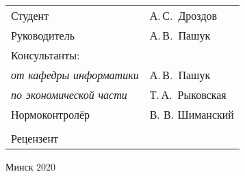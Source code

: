 \begin{titlepage}
\begin{center}
    \begin{tabular}{ p{}p{} }
      Студент & А.\,С.~Дроздов \\
      Руководитель & А.\,В.~Пашук \\
      Консультанты: &\\
      \hspace*{3ex}\emph{от кафедры информатики} & А.\,В.~Пашук \\
      \hspace*{3ex}\emph{по экономической части} & Т.\,А.~Рыковская \\
      Нормоконтролёр & В. В. Шиманский \\
      & \\
      Рецензент &
    \end{tabular}

    \vfill
    {\normalsize Минск 2020}
  \end{center}
\end{titlepage}
